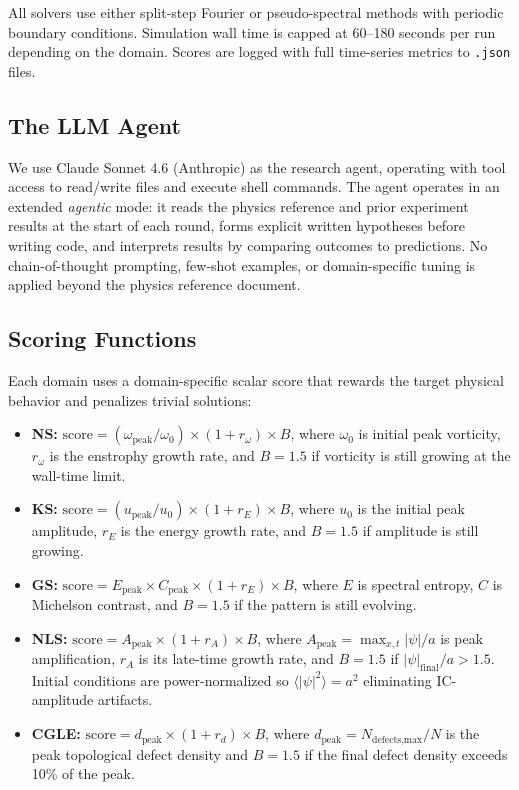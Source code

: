 \documentclass[11pt]{article}
\begin{document}
All solvers use either split-step Fourier or pseudo-spectral methods with
periodic boundary conditions. Simulation wall time is capped at 60--180 seconds
per run depending on the domain. Scores are logged with full time-series
metrics to \texttt{.json} files.

\subsection{The LLM Agent}

We use Claude Sonnet 4.6 (Anthropic) as the research agent, operating
with tool access to read/write files and execute shell commands.
The agent operates in an extended \emph{agentic} mode: it reads the physics
reference and prior experiment results at the start of each round,
forms explicit written hypotheses before writing code, and interprets
results by comparing outcomes to predictions.
No chain-of-thought prompting, few-shot examples, or domain-specific
tuning is applied beyond the physics reference document.

\subsection{Scoring Functions}

Each domain uses a domain-specific scalar score that rewards the target
physical behavior and penalizes trivial solutions:
\begin{itemize}
  \item \textbf{NS:} $\text{score} = (\omega_\text{peak}/\omega_0) \times
    (1 + r_\omega) \times B$, where $\omega_0$ is initial peak vorticity,
    $r_\omega$ is the enstrophy growth rate, and $B=1.5$ if vorticity is
    still growing at the wall-time limit.
  \item \textbf{KS:} $\text{score} = (u_\text{peak}/u_0) \times (1+r_E)
    \times B$, where $u_0$ is the initial peak amplitude, $r_E$ is
    the energy growth rate, and $B=1.5$ if amplitude is still growing.
  \item \textbf{GS:} $\text{score} = E_\text{peak} \times C_\text{peak}
    \times (1+r_E) \times B$, where $E$ is spectral entropy, $C$ is
    Michelson contrast, and $B=1.5$ if the pattern is still evolving.
  \item \textbf{NLS:} $\text{score} = A_\text{peak} \times (1+r_A) \times B$,
    where $A_\text{peak} = \max_{x,t}|\psi|/a$ is peak amplification,
    $r_A$ is its late-time growth rate, and $B=1.5$ if $|\psi|_\text{final}/a
    > 1.5$. Initial conditions are power-normalized so $\langle|\psi|^2\rangle
    = a^2$ eliminating IC-amplitude artifacts.
  \item \textbf{CGLE:} $\text{score} = d_\text{peak} \times (1+r_d) \times B$,
    where $d_\text{peak} = N_\text{defects,max}/N$ is the peak topological
    defect density and $B=1.5$ if the final defect density exceeds 10\% of
    the peak.
\end{itemize}
\end{document}
